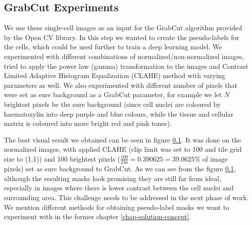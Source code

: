 \subsection{GrabCut Experiments}
We use these single-cell images as an input for the GrabCut algorithm provided by the Open CV library. In this step we wanted to create the pseudo-labels for the cells, which could be used further to train a deep learning model. We experimented with different combinations of normalized/non-normalized images, tried to apply the power law (gamma) transformation to the images and Contrast Limited Adaptive Histogram Equalization (CLAHE) method with varying parameters as well. We also experimented with different number of pixels that were set as sure background as a GrabCut parameter, for example we let $N$ brightest pixels be the sure background (since cell nuclei are coloured by haematoxylin into deep purple and blue colours, while the tissue and cellular matrix is coloured into more bright red and pink tones). 

The best visual result we obtained can be seen in figure \ref{}. It was done on the normalized images, with applied CLAHE (clip limit was set to 100 and tile grid size to (1,1)) and 100 brightest pixels ($\frac{100}{256} = 0.390625 = 39.0625\%$ of image pixels) set as sure background to GrabCut. As we can see from the figure \ref{}, although the resulting masks look promising they are still far from ideal, especially in images where there is lower contrast between the cell nuclei and surrounding area. This challenge needs to be addressed in the next phase of work. We mention different methods for obtaining pseudo-label masks we want to experiment with in the former chapter \ref{chap-solution-concept}. 